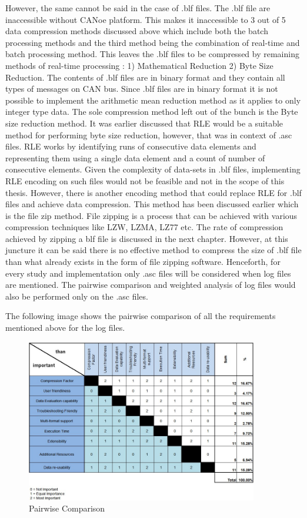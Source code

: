 However, the same cannot be said in the case of .blf files. The .blf file are inaccessible without CANoe platform. This makes it inaccessible to 3 out of 5 data compression methods discussed above which include both the batch processing methods and the third method being the combination of real-time and batch processing method. This leaves the .blf files to be compressed by remaining methods of real-time processing : 1) Mathematical Reduction 2) Byte Size Reduction. The contents of .blf files are in binary format and they contain all types of messages on CAN bus. Since .blf files are in binary format it is not possible to implement the arithmetic mean reduction method as it applies to only integer type data. The sole compression method left out of the bunch is the Byte size reduction method. It was earlier discussed that RLE would be a suitable method for performing byte size reduction, however, that was in context of .asc files. RLE works by identifying runs of consecutive data elements and representing them using a single data element and a count of number of consecutive elements. Given the complexity of data-sets in .blf files, implementing RLE encoding on such files would not be feasible and not in the scope of this thesis. However, there is another encoding method that could replace RLE for .blf files and achieve data compression. This method has been discussed earlier which is the file zip method. File zipping is a process that can be achieved with various compression techniques like LZW, LZMA, LZ77 etc. The rate of compression achieved by zipping a blf file is discussed in the next chapter. However, at this juncture it can be said there is no effective method to compress the size of .blf file than what already exists in the form of file zipping software. Henceforth, for every study and implementation only .asc files will be considered when log files are mentioned. The pairwise comparison and weighted analysis of log files would also be performed only on the .asc files. 

The following image shows the pairwise comparison of all the requirements mentioned above for the log files. \newpage


\begin{figure}[!h]
    	\centering
    	\includegraphics[width= 0.9\textwidth]{images/Paarweise.jpg}
    	\caption [Pairwise Comparison]{Pairwise Comparison}  
    	\label{fig:Pairwise Comparison}
\end{figure}

